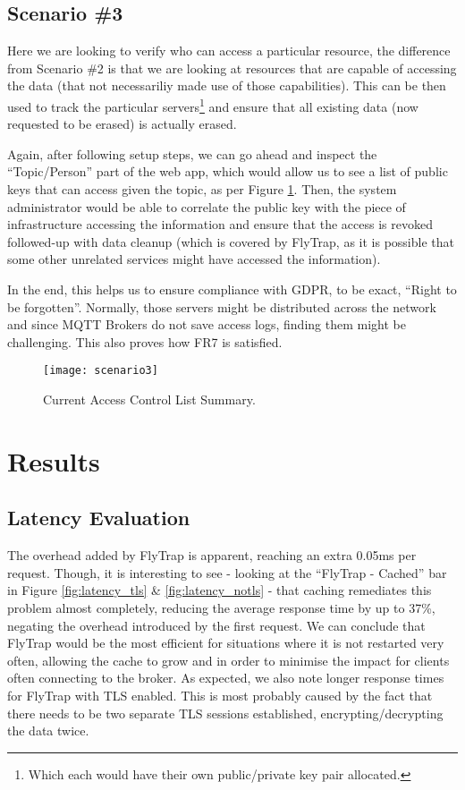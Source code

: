 \subsection{Scenario \#3}
Here we are looking to verify who can access a particular resource, the difference from Scenario \#2 is that we are looking at resources that are capable of accessing the data (that not necessariliy made use of those capabilities). This can be then used to track the particular servers\footnote{Which each would have their own public/private key pair allocated.} and ensure that all existing data (now requested to be erased) is actually erased.

Again, after following setup steps, we can go ahead and inspect the ``Topic/Person'' part of the web app, which would allow us to see a list of public keys that can access given the topic, as per Figure \ref{fig:scenario3}. Then, the system administrator would be able to correlate the public key with the piece of infrastructure accessing the information and ensure that the access is revoked followed-up with data cleanup (which is covered by FlyTrap, as it is possible that some other unrelated services might have accessed the information).

In the end, this helps us to ensure compliance with GDPR, to be exact, ``Right to be forgotten''. Normally, those servers might be distributed across the network and since MQTT Brokers do not save access logs, finding them might be challenging. This also proves how FR7 is satisfied.
\begin{figure}[h]
    \centering
    \texttt{[image: scenario3]}
    \caption{Current Access Control List Summary.}
    \label{fig:scenario3}
\end{figure}
\section{Results}
\subsection{Latency Evaluation}
The overhead added by FlyTrap is apparent, reaching an extra 0.05ms per request. Though, it is interesting to see - looking at the ``FlyTrap - Cached'' bar in Figure \ref{fig:latency_tls} \& \ref{fig:latency_notls} - that caching remediates this problem almost completely, reducing the average response time by up to 37\%, negating the overhead introduced by the first request. We can conclude that FlyTrap would be the most efficient for situations where it is not restarted very often, allowing the cache to grow and in order to minimise the impact for clients often connecting to the broker. As expected, we also note longer response times for FlyTrap with TLS enabled. This is most probably caused by the fact that there needs to be two separate TLS sessions established, encrypting/decrypting the data twice.

